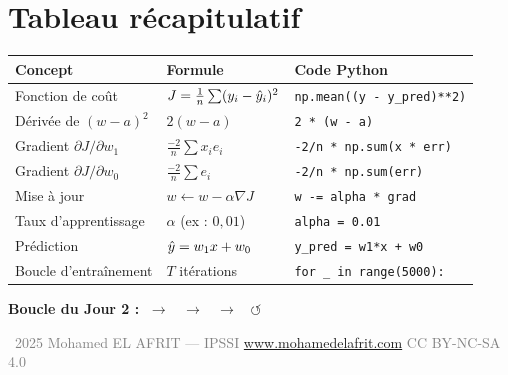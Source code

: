 \section{Tableau r\'{e}capitulatif}

\begin{center}
\renewcommand{\arraystretch}{1.35}
\begin{tabularx}{\textwidth}{l >{\centering\arraybackslash}p{4cm} X}
    \toprule
    \textbf{Concept} & \textbf{Formule} & \textbf{Code Python} \\
    \midrule
    Fonction de co\^{u}t
        & $J = \frac{1}{n}\sum(y_i-\hat{y}_i)^2$
        & \texttt{np.mean((y - y\_pred)**2)} \\
    D\'{e}riv\'{e}e de $(w{-}a)^2$
        & $2(w-a)$
        & \texttt{2 * (w - a)} \\
    Gradient $\partial J / \partial w_1$
        & $\frac{-2}{n}\sum x_i e_i$
        & \texttt{-2/n * np.sum(x * err)} \\
    Gradient $\partial J / \partial w_0$
        & $\frac{-2}{n}\sum e_i$
        & \texttt{-2/n * np.sum(err)} \\
    Mise \`{a} jour
        & $w \leftarrow w - \alpha \nabla J$
        & \texttt{w -= alpha * grad} \\
    Taux d'apprentissage
        & $\alpha$ (ex : $0{,}01$)
        & \texttt{alpha = 0.01} \\
    Pr\'{e}diction
        & $\hat{y} = w_1 x + w_0$
        & \texttt{y\_pred = w1*x + w0} \\
    Boucle d'entra\^{i}nement
        & $T$ it\'{e}rations
        & \texttt{for \_ in range(5000):} \\
    \bottomrule
\end{tabularx}
\end{center}

\separateur

\begin{center}
    \small\sffamily
    \textbf{Boucle du Jour 2 :}\quad
    $\;\longrightarrow\;$
    $\;\longrightarrow\;$
    $\;\longrightarrow\;$
    $\;\circlearrowleft$
\end{center}

\vfill

\begin{center}
    {\footnotesize\sffamily\textcolor{gray}{%
        \textcopyright\ 2025 Mohamed EL AFRIT --- IPSSI \enspace\textbullet\enspace
        \url{www.mohamedelafrit.com} \enspace\textbullet\enspace
        CC BY-NC-SA 4.0
    }}
\end{center}


